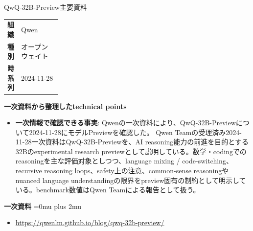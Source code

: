 \begin{technicalnote}{QwQ-32B-Preview}{主要資料}
\begingroup
\begin{tabularx}{\linewidth}{@{}>{\bfseries}p{0.22\linewidth}X@{}}
組織 & Qwen \\
種別 & オープンウェイト \\
時系列 & 2024-11-28 \\
\end{tabularx}
\smallskip
{\bfseries 一次資料から整理したtechnical points}
\begin{itemize}[leftmargin=1.5em,itemsep=0.35em]
\item \textbf{一次情報で確認できる事実}: Qwenの一次資料により、QwQ-32B-Previewについて2024-11-28にモデルPreviewを確認した。 Qwen Teamの受理済み2024-11-28一次資料はQwQ-32B-Previewを、AI reasoning能力の前進を目的とする32Bのexperimental research previewとして説明している。数学・codingでのreasoningを主な評価対象としつつ、language mixing / code-switching、recursive reasoning loops、safety上の注意、common-sense reasoningやnuanced language understandingの限界をpreview固有の制約として明示している。benchmark数値はQwen Teamによる報告として扱う。
\end{itemize}
\begin{minipage}{\linewidth}
\begin{samepage}
{\bfseries 一次資料}
\begingroup\sloppy
\Urlmuskip=0mu plus 2mu\relax
\begin{itemize}[leftmargin=1.5em,itemsep=0.25em]
\item {\scriptsize\url{https://qwenlm.github.io/blog/qwq-32b-preview/}}
\end{itemize}
\endgroup
\end{samepage}
\end{minipage}
\endgroup
\end{technicalnote}
\medskip

